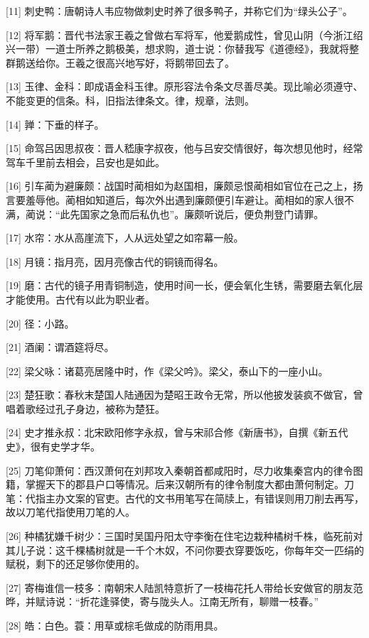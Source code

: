 \documentclass[12pt,UTF8]{ctexbook}
\begin{document}
[11] 刺史鸭：唐朝诗人韦应物做刺史时养了很多鸭子，并称它们为“绿头公子”。

[12] 将军鹅：晋代书法家王羲之曾做右军将军，他爱鹅成性，曾见山阴（今浙江绍兴一带）一道士所养之鹅极美，想求购，道士说：你替我写《道德经》，我就将整群鹅送给你。王羲之很高兴地写好，将鹅带回去了。

[13] 玉律、金科：即成语金科玉律。原形容法令条文尽善尽美。现比喻必须遵守、不能变更的信条。科，旧指法律条文。律，规章，法则。

[14] 亸：下垂的样子。

[15] 命驾吕因思叔夜：晋人嵇康字叔夜，他与吕安交情很好，每次想见他时，经常驾车千里前去相会，吕安也是如此。

[16] 引车蔺为避廉颇：战国时蔺相如为赵国相，廉颇忌恨蔺相如官位在己之上，扬言要羞辱他。蔺相如知道后，每次外出遇到廉颇便引车避让。蔺相如的家人很不满，蔺说：“此先国家之急而后私仇也”。廉颇听说后，便负荆登门请罪。

[17] 水帘：水从高崖流下，人从远处望之如帘幕一般。

[18] 月镜：指月亮，因月亮像古代的铜镜而得名。

[19] 磨：古代的镜子用青铜制造，使用时间一长，便会氧化生锈，需要磨去氧化层才能使用。古代有以此为职业者。

[20] 径：小路。

[21] 酒阑：谓酒筵将尽。

[22] 梁父咏：诸葛亮居隆中时，作《梁父吟》。梁父，泰山下的一座小山。

[23] 楚狂歌：春秋末楚国人陆通因为楚昭王政令无常，所以他披发装疯不做官，曾唱着歌经过孔子身边，被称为楚狂。

[24] 史才推永叔：北宋欧阳修字永叔，曾与宋祁合修《新唐书》，自撰《新五代史》，很有史学才华。

[25] 刀笔仰萧何：西汉萧何在刘邦攻入秦朝首都咸阳时，尽力收集秦宫内的律令图籍，掌握天下的郡县户口等情况。后来汉朝所有的律令制度大都由萧何制定。刀笔：代指主办文案的官吏。古代的文书用笔写在简牍上，有错误则用刀削去再写，故以刀笔代指使用刀笔的人。

[26] 种橘犹嫌千树少：三国时吴国丹阳太守李衡在住宅边栽种橘树千株，临死前对其儿子说：这千棵橘树就是一千个木奴，不问你要衣穿要饭吃，你每年交一匹绢的赋税，剩下的还足够你使用的。

[27] 寄梅谁信一枝多：南朝宋人陆凯特意折了一枝梅花托人带给长安做官的朋友范晔，并赋诗说：“折花逢驿使，寄与陇头人。江南无所有，聊赠一枝春。”

[28] 皓：白色。蓑：用草或棕毛做成的防雨用具。
\end{document}
